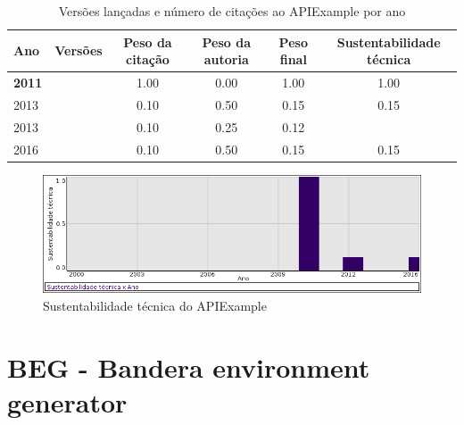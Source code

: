 \begin{table}[H]
\caption{Versões lançadas e número de citações ao APIExample por ano}
\centering
\begin{tabular}{| l | c | c | c | c | c |}
  \hline
  Ano & Versões & Peso da citação & Peso da autoria & Peso final & Sustentabilidade técnica \\
  \hline
            {\bf 2011}
          &
          
          &
          1.00
          &
          0.00
          &
          1.00
          &
            {\color{blue} 1.00}
          \\
\hline
            2013
          &
          
          &
          0.10
          &
          0.50
          &
          0.15
          &
            {\color{red} 0.15}
          \\
            2013
          &
          
          &
          0.10
          &
          0.25
          &
          0.12
          &
          \\
\hline
            2016
          &
          
          &
          0.10
          &
          0.50
          &
          0.15
          &
            {\color{red} 0.15}
          \\
\hline
\end{tabular}
\end{table}

\begin{figure}[h]
  \center
  \includegraphics[scale=0.50]{imagens/softwares-charts/apiexample.png}
  \caption{Sustentabilidade técnica do APIExample}
\end{figure}


\section{BEG - Bandera environment generator}


